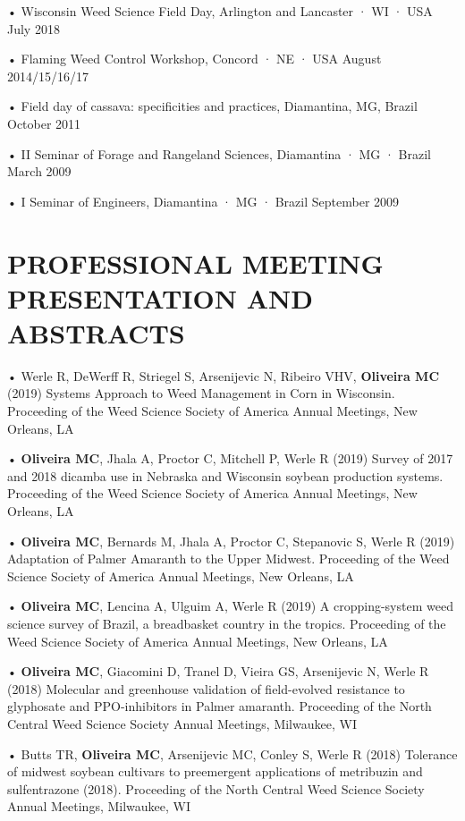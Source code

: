 \documentclass[11pt,]{article}
\begin{document}
• Wisconsin Weed Science Field Day, Arlington and Lancaster · WI · USA
\hfill July 2018

• Flaming Weed Control Workshop, Concord · NE · USA \hfill August
2014/15/16/17

• Field day of cassava: specificities and practices, Diamantina, MG,
Brazil \hfill October 2011

• II Seminar of Forage and Rangeland Sciences, Diamantina · MG · Brazil
\hfill March 2009

• I Seminar of Engineers, Diamantina · MG · Brazil \hfill September 2009

\hypertarget{professional-meeting-presentation-and-abstracts}{%
\section{PROFESSIONAL MEETING PRESENTATION AND
ABSTRACTS}\label{professional-meeting-presentation-and-abstracts}}

• Werle R, DeWerff R, Striegel S, Arsenijevic N, Ribeiro VHV,
\textbf{Oliveira MC} (2019) Systems Approach to Weed Management in Corn
in Wisconsin. Proceeding of the Weed Science Society of America Annual
Meetings, New Orleans, LA

• \textbf{Oliveira MC}, Jhala A, Proctor C, Mitchell P, Werle R (2019)
Survey of 2017 and 2018 dicamba use in Nebraska and Wisconsin soybean
production systems. Proceeding of the Weed Science Society of America
Annual Meetings, New Orleans, LA

• \textbf{Oliveira MC}, Bernards M, Jhala A, Proctor C, Stepanovic S,
Werle R (2019) Adaptation of Palmer Amaranth to the Upper Midwest.
Proceeding of the Weed Science Society of America Annual Meetings, New
Orleans, LA

• \textbf{Oliveira MC}, Lencina A, Ulguim A, Werle R (2019) A
cropping-system weed science survey of Brazil, a breadbasket country in
the tropics. Proceeding of the Weed Science Society of America Annual
Meetings, New Orleans, LA

• \textbf{Oliveira MC}, Giacomini D, Tranel D, Vieira GS, Arsenijevic N,
Werle R (2018) Molecular and greenhouse validation of field-evolved
resistance to glyphosate and PPO-inhibitors in Palmer amaranth.
Proceeding of the North Central Weed Science Society Annual Meetings,
Milwaukee, WI

• Butts TR, \textbf{Oliveira MC}, Arsenijevic MC, Conley S, Werle R
(2018) Tolerance of midwest soybean cultivars to preemergent
applications of metribuzin and sulfentrazone (2018). Proceeding of the
North Central Weed Science Society Annual Meetings, Milwaukee, WI
\end{document}
